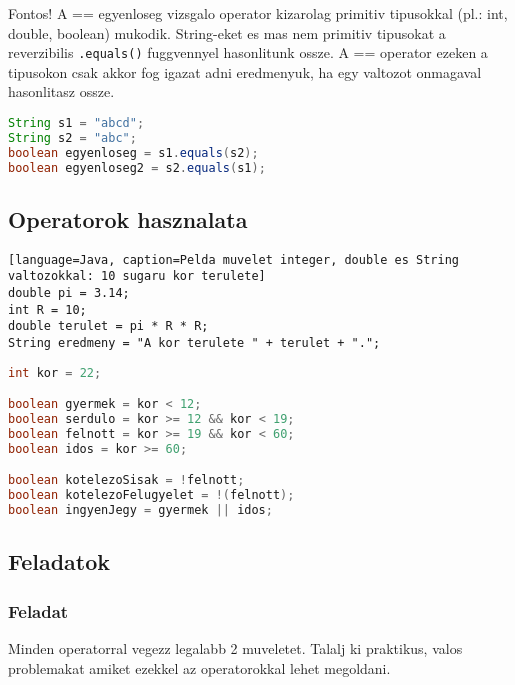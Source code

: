 \documentclass{article}
\begin{document}
Fontos!
A == egyenloseg vizsgalo operator kizarolag primitiv tipusokkal (pl.: int, double, boolean) mukodik. String-eket es mas nem primitiv tipusokat a reverzibilis \lstinline{.equals()} fuggvennyel hasonlitunk ossze. A == operator ezeken a tipusokon csak akkor fog igazat adni eredmenyuk, ha egy valtozot onmagaval hasonlitasz ossze.

\begin{lstlisting}[language=Java, caption=String egyenloseg vizsgalata helyesen]
String s1 = "abcd";
String s2 = "abc";
boolean egyenloseg = s1.equals(s2);
boolean egyenloseg2 = s2.equals(s1);
\end{lstlisting}

\newpage

\subsection{Operatorok hasznalata}

\begin{lstlisting}[language=Java, caption=Pelda muvelet integer, double es String valtozokkal: 10 sugaru kor terulete]
double pi = 3.14;
int R = 10;
double terulet = pi * R * R;
String eredmeny = "A kor terulete " + terulet + ".";
\end{lstlisting}

\begin{lstlisting}[language=Java, caption=Pelda muvelet boolean valtozokkal (kalandpark)]
int kor = 22;

boolean gyermek = kor < 12;
boolean serdulo = kor >= 12 && kor < 19;
boolean felnott = kor >= 19 && kor < 60;
boolean idos = kor >= 60;

boolean kotelezoSisak = !felnott;
boolean kotelezoFelugyelet = !(felnott);
boolean ingyenJegy = gyermek || idos;

\end{lstlisting}

\subsection{Feladatok}

\subsubsection{Feladat}

Minden operatorral vegezz legalabb 2 muveletet. Talalj ki praktikus, valos problemakat amiket ezekkel az operatorokkal lehet megoldani.
\end{document}
